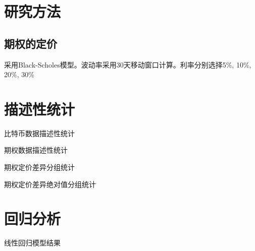 \documentclass[degree=bachelor]{thuthesis}
\begin{document}
\chapter{研究方法}
    \section{期权的定价}
    采用Black-Scholes模型。波动率采用30天移动窗口计算。利率分别选择5\%, 10\%, 20\%, 30\%

\chapter{描述性统计}

\begin{table}[!ht]
    \caption{比特币数据描述性统计}
    
\end{table}
\begin{table}[!ht]
    \caption{期权数据描述性统计}

\end{table}
\begin{table}[!ht]
    \caption{期权定价差异分组统计}
    
\end{table}
\begin{table}[!ht]
    \caption{期权定价差异绝对值分组统计}
    
\end{table}
\chapter{回归分析}
\begin{table}[!ht]
    \caption{线性回归模型结果}
    
\end{table}
\end{document}
